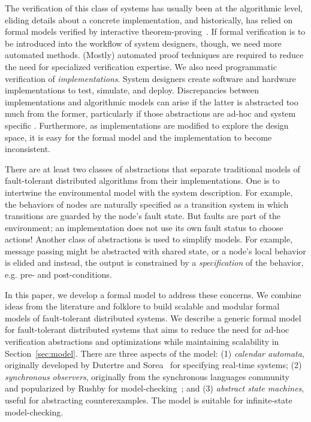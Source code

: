 \documentclass{llncs/llncs}
\newcommand{\ben}[1]{ } %
\newcommand{\ben}[1]{ {\color{purple}$<$ben: #1$>$} } %
\begin{document}
The verification of this class of systems has usually been at the algorithmic level, eliding details about a concrete implementation, and historically, has relied on formal models verified by interactive theorem-proving~\cite{om-acl2-impl,Young97:IC,csl-93-2,pvs}. If formal verification is to be introduced into the workflow of system designers, though, we need more automated methods. (Mostly) automated proof techniques are required to reduce the need for specialized verification expertise. We also need programmatic verification of \emph{implementations}. System designers create software and hardware implementations to test, simulate, and deploy. Discrepancies between implementations and algorithmic models can arise if the latter is abstracted too much from the former, particularly if those abstractions are ad-hoc and system specific \ben{for example?}. Furthermore, as implementations are modified to explore the design space, it is easy for the formal model and the implementation to become inconsistent.

There are at least two classes of abstractions that separate traditional models of fault-tolerant distributed algorithms from their implementations.  One is to intertwine the environmental model with the system description. For example, the behaviors of nodes are naturally specified as a transition system in which transitions are guarded by the node's fault state. But faults are part of the environment; an implementation does not use its own fault status to choose actions! Another class of abstractions is used to simplify models.  For example, message passing might be abstracted with shared state, or a node's local behavior is elided and instead, the output is constrained by a \emph{specification} of the behavior, e.g. pre- and post-conditions.

In this paper, we develop a formal model to address these concerns. We combine ideas from the literature and folklore to build scalable and modular formal models of fault-tolerant distributed systems. We describe a generic formal model for fault-tolerant distributed systems that aims to reduce the need for ad-hoc verification abstractions and optimizations while maintaining scalability in Section~\ref{sec:model}. There are three aspects of the model: (1) \emph{calendar automata}, originally developed by Dutertre and Sorea~\cite{cal} for specifying real-time systems; (2) \emph{synchronous observers}, originally from the synchronous languages community~\cite{Halbwachs-Lagnier:92,Halbwachs-Lagnier:94} and popularized by Rushby for model-checking~\cite{Rushby:SAS14}; and (3) \emph{abstract state machines}, useful for abstracting counterexamples. The model is suitable for infinite-state model-checking.
\end{document}
